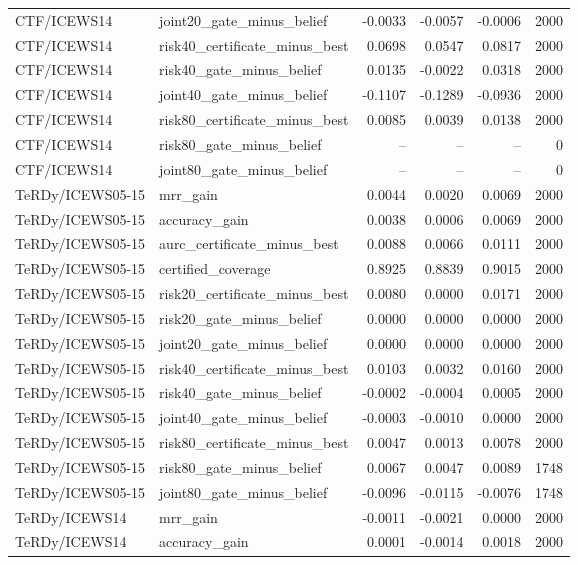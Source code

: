 \begin{longtable}{llrrrr}
CTF/ICEWS14 & joint20\_gate\_minus\_belief & -0.0033 & -0.0057 & -0.0006 & 2000\\
CTF/ICEWS14 & risk40\_certificate\_minus\_best & 0.0698 & 0.0547 & 0.0817 & 2000\\
CTF/ICEWS14 & risk40\_gate\_minus\_belief & 0.0135 & -0.0022 & 0.0318 & 2000\\
CTF/ICEWS14 & joint40\_gate\_minus\_belief & -0.1107 & -0.1289 & -0.0936 & 2000\\
CTF/ICEWS14 & risk80\_certificate\_minus\_best & 0.0085 & 0.0039 & 0.0138 & 2000\\
CTF/ICEWS14 & risk80\_gate\_minus\_belief & -- & -- & -- & 0\\
CTF/ICEWS14 & joint80\_gate\_minus\_belief & -- & -- & -- & 0\\
TeRDy/ICEWS05-15 & mrr\_gain & 0.0044 & 0.0020 & 0.0069 & 2000\\
TeRDy/ICEWS05-15 & accuracy\_gain & 0.0038 & 0.0006 & 0.0069 & 2000\\
TeRDy/ICEWS05-15 & aurc\_certificate\_minus\_best & 0.0088 & 0.0066 & 0.0111 & 2000\\
TeRDy/ICEWS05-15 & certified\_coverage & 0.8925 & 0.8839 & 0.9015 & 2000\\
TeRDy/ICEWS05-15 & risk20\_certificate\_minus\_best & 0.0080 & 0.0000 & 0.0171 & 2000\\
TeRDy/ICEWS05-15 & risk20\_gate\_minus\_belief & 0.0000 & 0.0000 & 0.0000 & 2000\\
TeRDy/ICEWS05-15 & joint20\_gate\_minus\_belief & 0.0000 & 0.0000 & 0.0000 & 2000\\
TeRDy/ICEWS05-15 & risk40\_certificate\_minus\_best & 0.0103 & 0.0032 & 0.0160 & 2000\\
TeRDy/ICEWS05-15 & risk40\_gate\_minus\_belief & -0.0002 & -0.0004 & 0.0005 & 2000\\
TeRDy/ICEWS05-15 & joint40\_gate\_minus\_belief & -0.0003 & -0.0010 & 0.0000 & 2000\\
TeRDy/ICEWS05-15 & risk80\_certificate\_minus\_best & 0.0047 & 0.0013 & 0.0078 & 2000\\
TeRDy/ICEWS05-15 & risk80\_gate\_minus\_belief & 0.0067 & 0.0047 & 0.0089 & 1748\\
TeRDy/ICEWS05-15 & joint80\_gate\_minus\_belief & -0.0096 & -0.0115 & -0.0076 & 1748\\
TeRDy/ICEWS14 & mrr\_gain & -0.0011 & -0.0021 & 0.0000 & 2000\\
TeRDy/ICEWS14 & accuracy\_gain & 0.0001 & -0.0014 & 0.0018 & 2000\\

\end{longtable}
